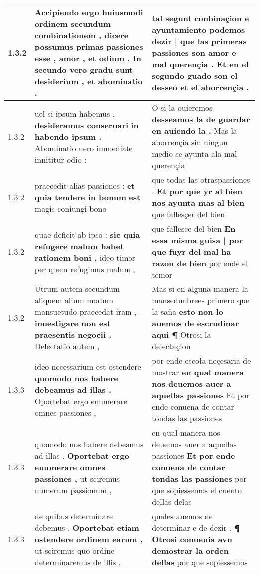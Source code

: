 \begin{tabular}{|p{1cm}|p{6.5cm}|p{6.5cm}|}
1.3.2 & Accipiendo ergo huiusmodi ordinem secundum combinationem , \textbf{ dicere possumus primas passiones esse , amor , et odium . } In secundo vero gradu sunt desiderium , et abominatio . & tal segunt conbinaçion \textbf{ e ayuntamiento podemos dezir | que las primeras passiones son amor e mal querençia . } Et en el segundo guado son el desseo et el aborrençia . \\\hline
1.3.2 & uel si ipsum habemus , \textbf{ desideramus conseruari in habendo ipsum . } Abominatio uero immediate innititur odio : & O si la ouieremos \textbf{ desseamos la de guardar en auiendo la . } Mas la aborrençia sin ningun medio se ayunta ala mal querençia \\\hline
1.3.2 & praecedit alias passiones : \textbf{ et quia tendere in bonum est } magis coniungi bono & que todas las otraspassiones . \textbf{ Et por que yr al bien nos ayunta mas al bien } que fallesçer del bien \\\hline
1.3.2 & quae deficit ab ipso : \textbf{ sic quia refugere malum habet rationem boni , } ideo timor per quem refugimus malum , & que fallesce del bien \textbf{ En essa misma guisa | por que fuyr del mal ha razon de bien } por ende el temor \\\hline
1.3.2 & Utrum autem secundum aliquem alium modum mansuetudo praecedat iram , \textbf{ inuestigare non est praesentis negocii . } Delectatio autem , & Mas si en alguna manera la mansedunbrees primero que la saña \textbf{ esto non lo auemos de escrudinar aqui ¶ } Otrosi la delectaçion \\\hline
1.3.3 & ideo necessarium est ostendere \textbf{ quomodo nos habere debeamus ad illas . } Oportebat ergo enumerare omnes passiones , & por ende escoła neçesaria de mostrar \textbf{ en qual manera nos deuemos auer a aquellas passiones } Et por ende conuena de contar tondas las passiones \\\hline
1.3.3 & quomodo nos habere debeamus ad illas . \textbf{ Oportebat ergo enumerare omnes passiones , } ut sciremus numerum passionum , & en qual manera nos deuemos auer a aquellas passiones \textbf{ Et por ende conuena de contar tondas las passiones } por que sopiessemos el cuento dellas delas \\\hline
1.3.3 & de quibus determinare debemus . \textbf{ Oportebat etiam ostendere ordinem earum , } ut sciremus quo ordine determinaremus de illis . & quales auemos de determinar e de dezir . \textbf{ ¶ Otrosi conuenia avn demostrar la orden dellas } por que sopiessemos \\\hline

\end{tabular}
